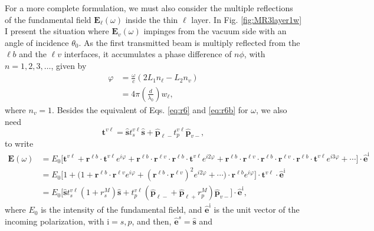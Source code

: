 For a more complete formulation, we must also consider the multiple reflections
of the fundamental field $\mathbf{E}_{\ell}(\omega)$ inside the thin $\ell$
layer. In Fig. \ref{fig:MR3layer1w} I present the situation where
$\mathbf{E}_{v}(\omega)$ impinges from the vacuum side with an angle of
incidence $\theta_{0}$. As the first transmitted beam is multiply reflected from
the $\ell b$ and the $\ell v$ interfaces, it accumulates a phase difference of
$n\phi$, with $n=1,2,3,\ldots$, given by
\begin{equation}\label{mphi}
\begin{split}
\varphi &= \frac{\omega}{c}(2L_{1}n_{\ell} - L_{2}n_{v})\\
&= 4\pi\left(\frac{d}{\lambda_{0}}\right)w_{\ell},
\end{split}
\end{equation}
where $n_{v}=1$. Besides the equivalent of Eqs. \eqref{eq:r6} and \eqref{eq:r6b}
for $\omega$, we also need
\begin{equation}\label{eq:mvv}
\mathbf{t}^{v\ell}
= \hat{\mathbf{s}}t_{s}^{v\ell}\hat{\mathbf{s}} 
+ \hat{\mathbf{p}}_{\ell -}t_{p}^{v\ell}\hat{\mathbf{p}}_{v-},
\end{equation}
to write
\begin{align}\label{eq:mcvew}
\mathbf{E}(\omega)
&= E_{0}
\Big[
\mathbf{t}^{v\ell} + \mathbf{r}^{\ell b}\cdot\mathbf{t}^{v\ell}e^{i\varphi}
 + \mathbf{r}^{\ell b}\cdot\mathbf{r}^{\ell v}\cdot
   \mathbf{r}^{\ell b}\cdot\mathbf{t}^{v\ell} e^{i2\varphi}
 + \mathbf{r}^{\ell b}\cdot\mathbf{r}^{\ell v}\cdot
   \mathbf{r}^{\ell b}\cdot\mathbf{r}^{\ell v}\cdot
   \mathbf{r}^{\ell b}\cdot\mathbf{t}^{v\ell} e^{i3\varphi}
 + \cdots
\Big]\cdot\hat{\mathbf{e}}^{\mathrm{i}}\nonumber\\
&= E_{0}
\Big[
1 + \Big(1 + \mathbf{r}^{\ell b}\cdot\mathbf{r}^{\ell v}e^{i\varphi}
+ (\mathbf{r}^{\ell b}\cdot\mathbf{r}^{\ell v})^2e^{i2\varphi}+\cdots\Big)\cdot
\mathbf{r}^{\ell b}e^{i\varphi}
\Big]
\cdot\mathbf{t}^{v\ell}\cdot\hat{\mathbf{e}}^{\mathrm{i}}\nonumber\\
&= E_{0}
\Big[
\hat{\mathbf{s}} t^{v\ell}_{s}(1+r^{M}_{s})\hat{\mathbf{s}} 
+ t^{v\ell}_{p}
\left(\hat{\mathbf{p}}_{\ell-}+\hat{\mathbf{p}}_{\ell+}r^{M}_{p}\right)
\hat{\mathbf{p}}_{v-}
\Big]\cdot\hat{\mathbf{e}}^{\mathrm{i}},
\end{align}
where $E_{0}$ is the intensity of the fundamental field, and
$\hat{\mathbf{e}}^{\mathrm{i}}$ is the unit vector of the incoming polarization,
with $\mathrm{i} = s,p$, and then, $\hat{\mathbf{e}}^{s}=\hat{\mathbf{s}}$ and
